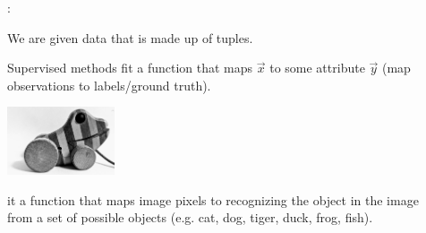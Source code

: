 \begin{frame}{\secname:~\subsecname}

We are given data that is made up of tuples.

Supervised methods fit a function that maps $\vec x$ to some attribute $\vec y$ (map observations to labels/ground truth).

\begin{center}
	\includegraphics[height=2cm]{img/tigerente}
\end{center}

it a function that maps image pixels to recognizing the object in the image\\
from a set of possible objects (e.g. cat, dog, tiger, duck, frog, fish).
    
\end{frame}

